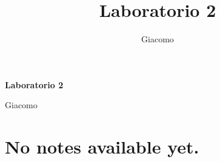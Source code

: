 \documentclass{article}
\title{Laboratorio 2}
\author{Giacomo}
\begin{document}
\begin{titlepage}

    \centering
    {\Huge\bfseries Laboratorio 2\par}
    \vspace{1.5cm}
    {\large Giacomo\par}
\end{titlepage}





\section*{No notes available yet.}
\end{document}
